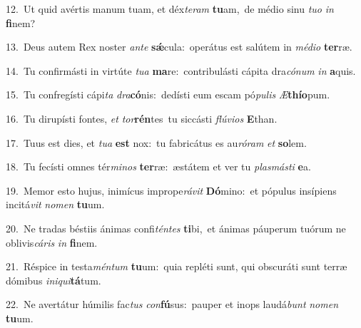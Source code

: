 {\numbfont\textcolor{\numbcolor}{12.}}~Ut quid avértis manum tuam, et déx\-\textit{te}\-\textit{ram} \textbf{tu}\-am,~\star de médio sinu \textit{tu}\-\textit{o} \textit{in} \textbf{fi}\-nem?\par
{\numbfont\textcolor{\numbcolor}{13.}}~Deus autem Rex noster \textit{an}\-\textit{te} \textbf{sǽ}\-cula:~\star operátus est salútem in \textit{mé}\-\textit{di}\textit{o} \textbf{ter}\-ræ.\par
{\numbfont\textcolor{\numbcolor}{14.}}~Tu confirmásti in virtúte \textit{tu}\-\textit{a} \textbf{ma}\-re:~\star contribulásti cápita dra\-\textit{có}\-\textit{num} \textit{in} \textbf{a}\-quis.\par
{\numbfont\textcolor{\numbcolor}{15.}}~Tu confregísti cápi\textit{ta} \textit{dra}\-\textbf{có}nis:~\star dedísti eum escam pó\-\textit{pu}\-\textit{lis} \textit{Æ}\-\textbf{thí}\textbf{o}pum.\par
{\numbfont\textcolor{\numbcolor}{16.}}~Tu dirupísti fontes, \textit{et} \textit{tor}\-\textbf{rén}tes~\star tu siccásti \textit{flú}\-\textit{vi}\textit{os} \textbf{E}\-than.\par
{\numbfont\textcolor{\numbcolor}{17.}}~Tuus est dies, et \textit{tu}\-\textit{a} \textbf{est} nox:~\star tu fabricátus es au\-\textit{ró}\-\textit{ram} \textit{et} \textbf{so}\-lem.\par
{\numbfont\textcolor{\numbcolor}{18.}}~Tu fecísti omnes tér\-\textit{mi}\-\textit{nos} \textbf{ter}\-ræ:~\star æstátem et ver tu \textit{plas}\-\textit{más}\textit{ti} \textbf{e}\-a.\par
{\numbfont\textcolor{\numbcolor}{19.}}~Memor esto hujus, inimícus imprope\-\textit{rá}\-\textit{vit} \textbf{Dó}\-mino:~\star et pópulus insípiens incitá\textit{vit} \textit{no}\-\textit{men} \textbf{tu}\-um.\par
{\numbfont\textcolor{\numbcolor}{20.}}~Ne tradas béstiis ánimas confi\-\textit{tén}\-\textit{tes} \textbf{ti}\-bi,~\star et ánimas páuperum tuórum ne oblivis\-\textit{cá}\-\textit{ris} \textit{in} \textbf{fi}\-nem.\par
{\numbfont\textcolor{\numbcolor}{21.}}~Réspice in testa\-\textit{mén}\-\textit{tum} \textbf{tu}\-um:~\star quia repléti sunt, qui obscuráti sunt terræ dómibus \textit{in}\-\textit{i}\textit{qui}\textbf{tá}tum.\par
{\numbfont\textcolor{\numbcolor}{22.}}~Ne avertátur húmilis fac\textit{tus} \textit{con}\-\textbf{fú}sus:~\star pauper et inops laudá\textit{bunt} \textit{no}\-\textit{men} \textbf{tu}\-um.\par
